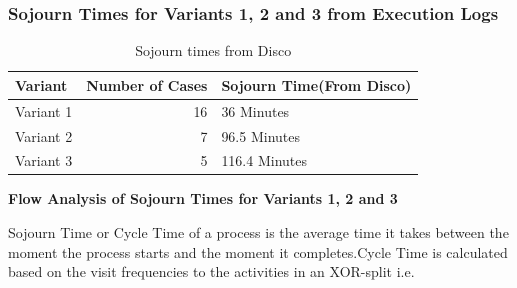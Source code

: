 \documentclass[a4paper]{article} %
\begin{document}
\subsubsection*{Sojourn Times for Variants 1, 2 and 3 from Execution Logs}
\begin{table}[H]
  \centering
  
    \begin{tabular}{|l|r|l|}
    \hline
    Variant & \multicolumn{1}{l|}{Number of Cases} & Sojourn Time(From Disco) \bigstrut\\
    \hline
    Variant 1 & 16    & 36 Minutes \bigstrut\\
    \hline
    Variant 2 & 7     & 96.5 Minutes \bigstrut\\
    \hline
    Variant 3 & 5     & 116.4 Minutes \bigstrut\\
    \hline
    \end{tabular}%
    \caption{Sojourn times from Disco}
  \label{tab:addlabel}%
\end{table}%

\begin{flushleft}
\textbf{Flow Analysis of Sojourn Times for Variants 1, 2 and 3}
\end{flushleft}
Sojourn Time or Cycle Time of a process is the average time it takes between the moment the process starts and the moment it completes.Cycle Time is calculated based on the visit frequencies to the activities in an XOR-split i.e.
\end{document}
